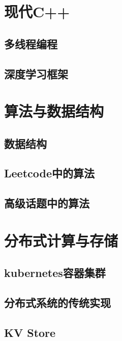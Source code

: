 \documentclass[11pt,oneside]{book}
\begin{document}


\tableofcontents

\chapter{现代C++}


\section{多线程编程}
\lipsum[1-2]

\section{深度学习框架}
\lipsum[1-2]

\chapter{算法与数据结构}
\section{数据结构}

\section{Leetcode中的算法}

\section{高级话题中的算法}


\chapter{分布式计算与存储}
\section{kubernetes容器集群}
\lipsum[1-3]

\section{分布式系统的传统实现}
\lipsum[1-2]

\section{KV Store}
\lipsum[1-2]
\end{document}
